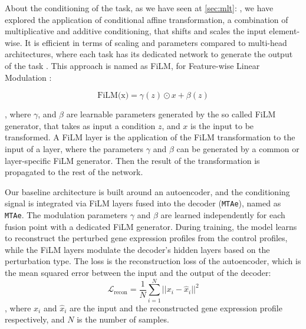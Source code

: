 \documentclass[12pt, a4paper]{article}
\newcommand{\crefwithname}[1]{\cref{#1}: \nameref{#1}}
\begin{document}
About the conditioning of the task, as we have seen at \crefwithname{sec:mlt}, we have explored the application of conditional affine transformation, a combination of multiplicative and additive conditioning, that shifts and scales the input element-wise. It is efficient in terms of scaling and parameters compared to multi-head architectures, where each task has its dedicated network to generate the output of the task . This approach is named as FiLM, for Feature-wise Linear Modulation \cite{dumoulin2018feature-wise, perez2018film}:

\[ \text{FiLM(x)} = \gamma (z) \odot x + \beta (z) \]

, where $\gamma$, and $\beta$ are learnable parameters generated by the so called FiLM generator, that takes as input a condition $z$, and $x$ is the input to be transformed. 
A FiLM layer is the application of the FiLM transformation to the input of a layer, where the parameters $\gamma$ and $\beta$ can be generated by a common or layer-specific FiLM generator.   Then the result of the transformation is propagated to the rest of the network.





Our baseline architecture is built around an autoencoder, and the conditioning signal is integrated via FiLM layers fused into the decoder (\verb|MTAe|), named as \verb|MTAe|. The modulation parameters $\gamma$ and $\beta$ are learned independently for each fusion point with a dedicated FiLM generator.
During training, the model learns to reconstruct the perturbed gene expression profiles from the control profiles, while the FiLM layers modulate the decoder's hidden layers based on the perturbation type.
The loss is the reconstruction loss of the autoencoder, which is the mean squared error between the input and the output of the decoder:
\[
\mathcal{L}_{\text{recon}} = \frac{1}{N} \sum_{i=1}^{N} ||x_i - \hat{x}_i||^2 \]
, where $x_i$ and $\hat{x}_i$ are the input and the reconstructed gene expression profile respectively, and $N$ is the number of samples.
\end{document}
